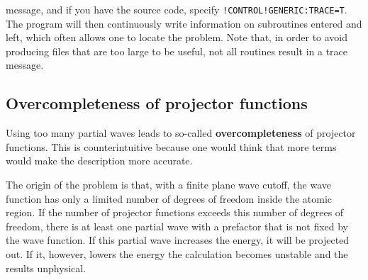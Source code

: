 \documentclass[final,12pt,makeidx,DIV=calc]{article}
\begin{document}
{{{{{{\begin{enumerate}
  message, and if you have the source code, specify
  \verb|!CONTROL!GENERIC:TRACE=T|. The program will then
  continuously write information on subroutines entered and left,
  which often allows one to locate the problem. Note that, in order to
  avoid producing files that are too large to be useful, not all routines
  result in a trace message.   %
\end{enumerate}


\subsection{Overcompleteness of projector functions}
Using too many partial waves leads to so-called
\textbf{overcompleteness} of projector
functions.  This is counterintuitive because one would think that more
terms would make the description more accurate. 

The origin of the problem is that, with a finite plane wave cutoff,
the wave function has only a limited number of degrees of freedom
inside the atomic region. If the number of projector functions
exceeds this number of degrees of freedom, there is at least one
partial wave with a prefactor that is not fixed by the wave function.
If this partial wave increases the energy, it will be projected
out. If it, however, lowers the energy the calculation becomes
unstable and the results unphysical.

}}}}}}
\end{document}
